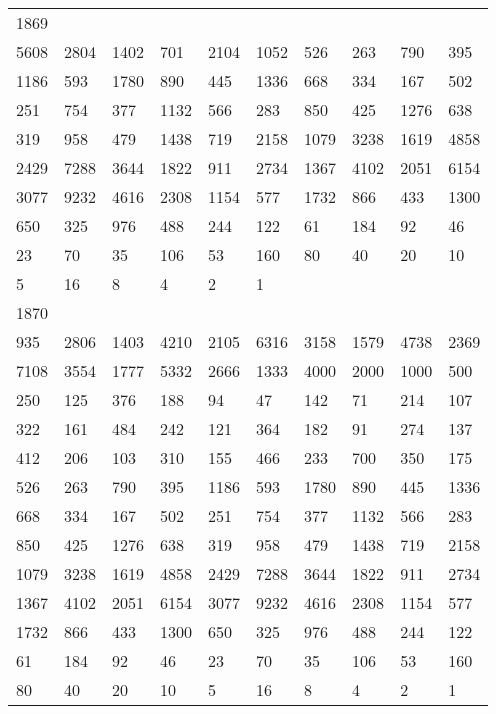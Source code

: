\begin{longtable}{*{10}{l}}
1869&&&&&&&&&\\
5608& 2804& 1402& 701& 2104& 1052& 526& 263& 790& 395\\
1186& 593& 1780& 890& 445& 1336& 668& 334& 167& 502\\
251& 754& 377& 1132& 566& 283& 850& 425& 1276& 638\\
319& 958& 479& 1438& 719& 2158& 1079& 3238& 1619& 4858\\
2429& 7288& 3644& 1822& 911& 2734& 1367& 4102& 2051& 6154\\
3077& 9232& 4616& 2308& 1154& 577& 1732& 866& 433& 1300\\
650& 325& 976& 488& 244& 122& 61& 184& 92& 46\\
23& 70& 35& 106& 53& 160& 80& 40& 20& 10\\
5& 16& 8& 4& 2& 1& \\

1870&&&&&&&&&\\
935& 2806& 1403& 4210& 2105& 6316& 3158& 1579& 4738& 2369\\
7108& 3554& 1777& 5332& 2666& 1333& 4000& 2000& 1000& 500\\
250& 125& 376& 188& 94& 47& 142& 71& 214& 107\\
322& 161& 484& 242& 121& 364& 182& 91& 274& 137\\
412& 206& 103& 310& 155& 466& 233& 700& 350& 175\\
526& 263& 790& 395& 1186& 593& 1780& 890& 445& 1336\\
668& 334& 167& 502& 251& 754& 377& 1132& 566& 283\\
850& 425& 1276& 638& 319& 958& 479& 1438& 719& 2158\\
1079& 3238& 1619& 4858& 2429& 7288& 3644& 1822& 911& 2734\\
1367& 4102& 2051& 6154& 3077& 9232& 4616& 2308& 1154& 577\\
1732& 866& 433& 1300& 650& 325& 976& 488& 244& 122\\
61& 184& 92& 46& 23& 70& 35& 106& 53& 160\\
80& 40& 20& 10& 5& 16& 8& 4& 2& 1\\


\end{longtable}
